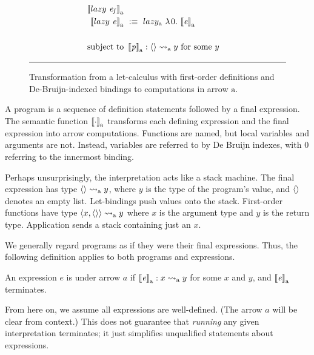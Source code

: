 \documentclass{llncs}
\newcommand{\arrow}{\rightsquigarrow}
\newcommand{\arrowlazy}{\ensuremath{lazy}}
\newcommand{\gen}{_\mathrm{a}}
\begin{document}
\begin{figure*}[t]
\begin{align*}
\begin{aligned}[t]
			\meaningof{lazy~\mathit{e_f}}\gen
\\
	\meaningof{lazy~\mathit{e}}\gen &\ :\equiv\ \arrowlazy\gen~\fun{0}{\meaningof{\mathit{e}}\gen}
\\
\\
	\text{subject to} &\ \meaningof{\mathit{p}}\gen : \pair{} \arrow\gen y \ \text{for some $y$}
\end{aligned}
\end{align*}
\hrule
\caption[ ]{Transformation from a let-calculus with first-order definitions and De-Bruijn-indexed bindings to computations in arrow $\mathrm{a}$.
}
\label{fig:semantic-function}
\end{figure*}

A program is a sequence of definition statements followed by a final expression.
The semantic function $\meaningof{\cdot}\gen$ transforms each defining expression and the final expression into arrow computations.
Functions are named, but local variables and arguments are not.
Instead, variables are referred to by De Bruijn indexes, with $0$ referring to the innermost binding.

Perhaps unsurprisingly, the interpretation acts like a stack machine.
The final expression has type $\pair{} \arrow\gen y$, where $y$ is the type of the program's value, and $\langle{}\rangle$ denotes an empty list.
Let-bindings push values onto the stack.
First-order functions have type $\pair{x,\pair{}} \arrow\gen y$ where $x$ is the argument type and $y$ is the return type.
Application sends a stack containing just an $x$.

We generally regard programs as if they were their final expressions.
Thus, the following definition applies to both programs and expressions.

\begin{definition}
\label{def:well-defined-expression}
An expression $\mathit{e}$ is  under arrow $a$ if $\meaningof{\mathit{e}}\gen : x \arrow\gen y$ for some $x$ and $y$, and $\meaningof{\mathit{e}}\gen$ terminates.%
\end{definition}

From here on, we assume all expressions are well-defined.
(The arrow $a$ will be clear from context.)
This does not guarantee that \emph{running} any given interpretation terminates; it just simplifies unqualified statements about expressions.
\end{document}
